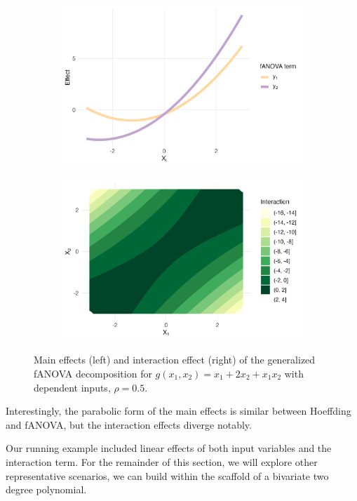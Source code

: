 \begin{figure}[htpb]
    \centering
    \begin{subfigure}[t]{0.49\textwidth}
        \centering
        \includegraphics[width=\textwidth]{images/experiment_section/running_example_a1p10_a2p20_a11p00_a22p00_a12p10_rhop05_main.png}
    \end{subfigure}%
    \hfill
    \begin{subfigure}[t]{0.49\textwidth}
        \centering
        \includegraphics[width=\textwidth]{images/experiment_section/running_example_a1p10_a2p20_a11p00_a22p00_a12p10_rhop05_interaction.png}
    \end{subfigure}
    \caption{Main effects (left) and interaction effect (right) of the generalized fANOVA decomposition for $g(x_1, x_2) = x_1 + 2 x_2 + x_1 x_2$ with dependent inputs, $\rho = 0.5$.}
    \label{fig:running_ex_dependent}
\end{figure}
Interestingly, the parabolic form of the main effects is similar between Hoeffding and fANOVA, but the interaction effects diverge notably.\par
Our running example included linear effects of both input variables and the interaction term. For the remainder of this section, we will explore other representative scenarios, we can build within the scaffold of a bivariate two degree polynomial.


